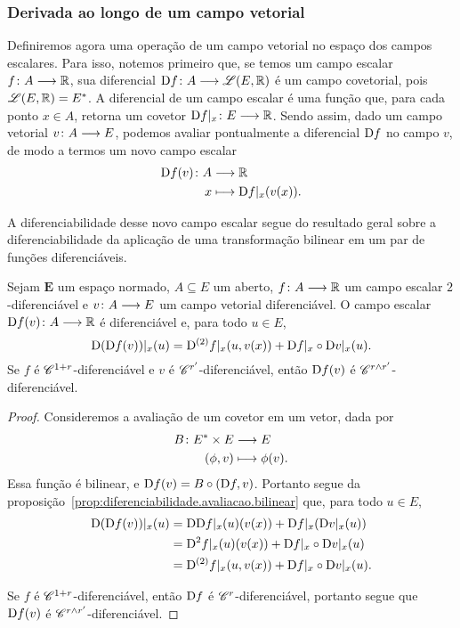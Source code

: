 \subsubsection{Derivada ao longo de um campo vetorial}

Definiremos agora uma operação de um campo vetorial no espaço dos campos escalares. Para isso, notemos primeiro que, se temos um campo escalar $f\colon \allowbreak A \longrightarrow \mathbb{R}$, sua diferencial $\mathrm{D} f\colon \allowbreak A \longrightarrow \mathscr{L}(E,\mathbb{R})$ é um campo covetorial, pois $\mathscr{L}(E, \mathbb{R}) = E^{\ast}$. A diferencial de um campo escalar é uma função que, para cada ponto $x \in A$, retorna um covetor $\mathrm{D} f|_x\colon \allowbreak E \longrightarrow \mathbb{R}$. Sendo assim, dado um campo vetorial $v\colon \allowbreak A \longrightarrow E$, podemos avaliar pontualmente a diferencial $\mathrm{D} f$ no campo $v$, de modo a termos um novo campo escalar
	\begin{align*}
	{\mathrm{D}f(v)}\colon {A} &\longrightarrow {\mathbb{R}} \\{x} &\longmapsto \mathrm{D} f|_x(v(x)).
	\end{align*}

A diferenciabilidade desse novo campo escalar segue do resultado geral sobre a diferenciabilidade da aplicação de uma transformação bilinear em um par de funções diferenciáveis.

\begin{proposition}
\label{prop:diferenciabilidade.contracao.covetor.vetor}
Sejam $\bm E$ um espaço normado, $A \subseteq E$ um aberto, $f\colon \allowbreak A \longrightarrow \mathbb{R}$ um campo escalar $2$-diferenciável e $v\colon \allowbreak A \longrightarrow E$ um campo vetorial diferenciável. O campo escalar $\mathrm{D} f(v)\colon \allowbreak A \longrightarrow \mathbb{R}$ é diferenciável e, para todo $u \in E$,
	\begin{equation*}
	\mathrm{D} (\mathrm{D} f(v))|_x(u) = \mathrm{D}^{(2)} f|_x(u, v(x)) + \mathrm{D} f|_x \circ \mathrm{D} v|_x(u).
	\end{equation*}
Se $f$ é $\mathscr{C}^{1+r}$-diferenciável e $v$ é $\mathscr{C}^{r'}$-diferenciável, então $\mathrm{D} f(v)$ é $\mathscr{C}^{r \mathbin{\wedge} r'}$-diferenciável.
\end{proposition}
\begin{proof}
Consideremos a avaliação de um covetor em um vetor, dada por
	\begin{align*}
	{B}\colon {E^{\ast}\times E} &\longrightarrow {E} \\{(\phi,v)} &\longmapsto \phi(v).
	\end{align*}
Essa função é bilinear, e $\mathrm{D} f(v) = B \circ (\mathrm{D} f, v)$. Portanto segue da proposição~\ref{prop:diferenciabilidade.avaliacao.bilinear} que, para todo $u \in E$,
	\begin{align*}
	\mathrm{D} (\mathrm{D} f(v))|_x(u) &= \mathrm{D} \mathrm{D} f|_x(u)(v(x)) + \mathrm{D} f|_x (\mathrm{D} v|_x(u)) \\
		&= \mathrm{D}^2 f|_x(u)(v(x)) + \mathrm{D} f|_x \circ \mathrm{D} v|_x(u) \\
		&= \mathrm{D}^{(2)} f|_x(u, v(x)) + \mathrm{D} f|_x \circ \mathrm{D} v|_x(u).		
	\end{align*}

Se $f$ é $\mathscr{C}^{1+r}$-diferenciável, então $\mathrm{D} f$ é $\mathscr{C}^r$-diferenciável, portanto segue que $\mathrm{D} f(v)$ é $\mathscr{C}^{r \mathbin{\wedge} r'}$-diferenciável.
\end{proof}

